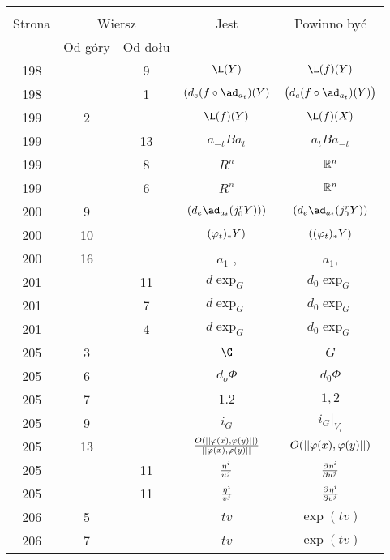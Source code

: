 \documentclass[a4paper,11pt]{article}
\begin{document}
\begin{center}
  \begin{tabular}{|c|c|c|c|c|}
    \hline
    & \multicolumn{2}{c|}{} & & \\
    Strona & \multicolumn{2}{c|}{Wiersz} & Jest
                              & Powinno być \\ \cline{2-3}
    & Od góry & Od dołu & & \\
    \hline
    198 & & 9 & $\L( Y )$ & $\L( f )( Y )$ \\
    198 & & 1 & $( d_{ e }( f \circ \ad_{ a_{ t } } )( Y )$
           & $\big( d_{ e }( f \circ \ad_{ a_{ t } } )( Y ) \big)$ \\
    199 & 2 & & $\L( f )( Y )$ & $\L( f )( X )$ \\
    199 & & 13 & $a_{ -t } B a_{ t }$ & $a_{ t } B a_{ -t }$ \\
    199 & &  8 & $R^{ n }$ & $\mathbb{R}^{ n }$ \\
    199 & &  6 & $R^{ n }$ & $\mathbb{R}^{ n }$ \\
    200 & 9 & & $( d_{ e }\ad_{ a_{ t } }( j^{ r }_{ 0 }Y ) ) )$
           & $( d_{ e }\ad_{ a_{ t } }( j^{ r }_{ 0 }Y ) )$ \\
    200 & 10 & & $( \varphi_{ t } )_{ * }Y )$ & $( ( \varphi_{ t } )_{ * }Y )$ \\
    200 & 16 & & $a_{ 1 }$ , & $a_{ 1 }$, \\
    201 & & 11 & $d \exp_{ G }$ & $d_{ 0 } \exp_{ G }$ \\
    201 & &  7 & $d \exp_{ G }$ & $d_{ 0 } \exp_{ G }$ \\
    201 & &  4 & $d \exp_{ G }$ & $d_{ 0 } \exp_{ G }$ \\
    205 &  3 & & $\G$ & $G$ \\
    205 &  6 & & $d_{ o }\Phi$ & $d_{ 0 }\Phi$ \\
    205 &  7 & & $1.2$ & $1, 2$ \\
    205 &  9 & & $i_{ G }$ & $i_{ G }|_{ V_{ i } }$ \\
    205 & 13 & & $\frac{ O( \left|\left|  \varphi( x ), \varphi( y )  \right|\right| ) }
                 { \left|\left|  \varphi( x ), \varphi( y )  \right|\right| }$
           & $O( \left|\left|  \varphi( x ), \varphi( y )  \right|\right| )$ \\
    205 & & 11 & $\frac{ \eta^{ i } }{ u^{ j } }$
           & $\frac{ \partial^{  } {  { \eta^{ i } }  } }{ \partial {  { u^{ j } }  }^{  } }$ \\
    205 & & 11 & $\frac{ \eta^{ i } }{ v^{ j } }$
           & $\frac{ \partial^{  } {  { \eta^{ i } }  } }{ \partial {  { v^{ j } }  }^{  } }$ \\
    206 &  5 & & $t v$ & $\exp( t v )$ \\
    206 &  7 & & $t v$ & $\exp( t v )$ \\

\end{tabular}
\end{center}
\end{document}
